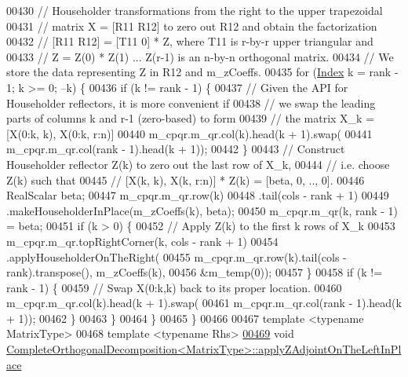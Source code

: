 \begin{DoxyCode}
00430     \textcolor{comment}{// Householder transformations from the right to the upper trapezoidal}
00431     \textcolor{comment}{// matrix X = [R11 R12] to zero out R12 and obtain the factorization}
00432     \textcolor{comment}{// [R11 R12] = [T11 0] * Z, where T11 is r-by-r upper triangular and}
00433     \textcolor{comment}{// Z = Z(0) * Z(1) ... Z(r-1) is an n-by-n orthogonal matrix.}
00434     \textcolor{comment}{// We store the data representing Z in R12 and m\_zCoeffs.}
00435     \textcolor{keywordflow}{for} (\hyperlink{namespace_eigen_a62e77e0933482dafde8fe197d9a2cfde}{Index} k = rank - 1; k >= 0; --k) \{
00436       \textcolor{keywordflow}{if} (k != rank - 1) \{
00437         \textcolor{comment}{// Given the API for Householder reflectors, it is more convenient if}
00438         \textcolor{comment}{// we swap the leading parts of columns k and r-1 (zero-based) to form}
00439         \textcolor{comment}{// the matrix X\_k = [X(0:k, k), X(0:k, r:n)]}
00440         m\_cpqr.m\_qr.col(k).head(k + 1).swap(
00441             m\_cpqr.m\_qr.col(rank - 1).head(k + 1));
00442       \}
00443       \textcolor{comment}{// Construct Householder reflector Z(k) to zero out the last row of X\_k,}
00444       \textcolor{comment}{// i.e. choose Z(k) such that}
00445       \textcolor{comment}{// [X(k, k), X(k, r:n)] * Z(k) = [beta, 0, .., 0].}
00446       RealScalar beta;
00447       m\_cpqr.m\_qr.row(k)
00448           .tail(cols - rank + 1)
00449           .makeHouseholderInPlace(m\_zCoeffs(k), beta);
00450       m\_cpqr.m\_qr(k, rank - 1) = beta;
00451       \textcolor{keywordflow}{if} (k > 0) \{
00452         \textcolor{comment}{// Apply Z(k) to the first k rows of X\_k}
00453         m\_cpqr.m\_qr.topRightCorner(k, cols - rank + 1)
00454             .applyHouseholderOnTheRight(
00455                 m\_cpqr.m\_qr.row(k).tail(cols - rank).transpose(), m\_zCoeffs(k),
00456                 &m\_temp(0));
00457       \}
00458       \textcolor{keywordflow}{if} (k != rank - 1) \{
00459         \textcolor{comment}{// Swap X(0:k,k) back to its proper location.}
00460         m\_cpqr.m\_qr.col(k).head(k + 1).swap(
00461             m\_cpqr.m\_qr.col(rank - 1).head(k + 1));
00462       \}
00463     \}
00464   \}
00465 \}
00466 
00467 \textcolor{keyword}{template} <\textcolor{keyword}{typename} MatrixType>
00468 \textcolor{keyword}{template} <\textcolor{keyword}{typename} Rhs>
\hyperlink{group___q_r___module_a0a89641e0b4ea92c515405f2a31e6abe}{00469} \textcolor{keywordtype}{void} \hyperlink{group___q_r___module_a0a89641e0b4ea92c515405f2a31e6abe}{CompleteOrthogonalDecomposition<MatrixType>::applyZAdjointOnTheLeftInPlace}

\end{DoxyCode}
